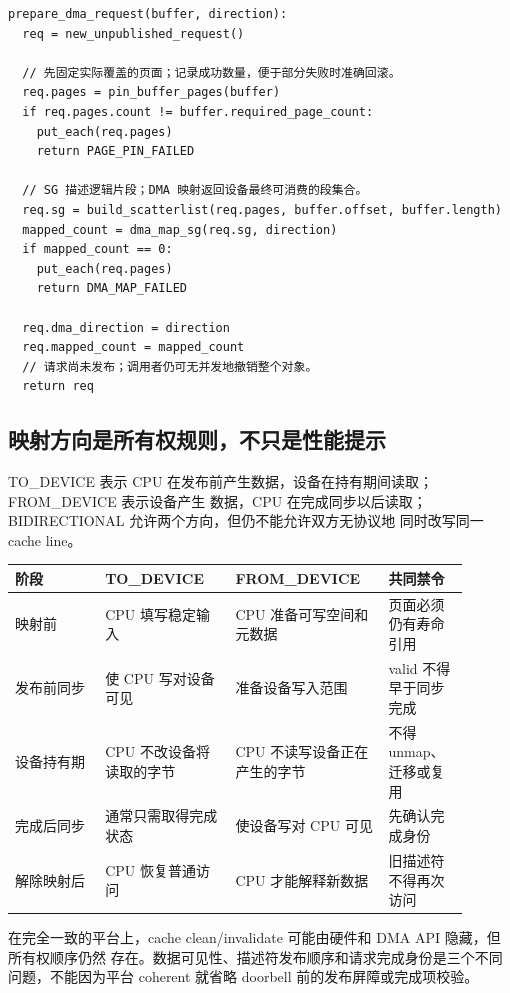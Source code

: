\begin{lstlisting}
prepare_dma_request(buffer, direction):
  req = new_unpublished_request()

  // 先固定实际覆盖的页面；记录成功数量，便于部分失败时准确回滚。
  req.pages = pin_buffer_pages(buffer)
  if req.pages.count != buffer.required_page_count:
    put_each(req.pages)
    return PAGE_PIN_FAILED

  // SG 描述逻辑片段；DMA 映射返回设备最终可消费的段集合。
  req.sg = build_scatterlist(req.pages, buffer.offset, buffer.length)
  mapped_count = dma_map_sg(req.sg, direction)
  if mapped_count == 0:
    put_each(req.pages)
    return DMA_MAP_FAILED

  req.dma_direction = direction
  req.mapped_count = mapped_count
  // 请求尚未发布；调用者仍可无并发地撤销整个对象。
  return req
\end{lstlisting}

\subsection{映射方向是所有权规则，不只是性能提示}

TO\_DEVICE 表示 CPU 在发布前产生数据，设备在持有期间读取；FROM\_DEVICE 表示设备产生
数据，CPU 在完成同步以后读取；BIDIRECTIONAL 允许两个方向，但仍不能允许双方无协议地
同时改写同一 cache line。

\begin{longtable}{|L{0.18\linewidth}|L{0.26\linewidth}|L{0.3\linewidth}|L{0.16\linewidth}|}
\hline
阶段 & TO\_DEVICE & FROM\_DEVICE & 共同禁令 \\ \hline
映射前 & CPU 填写稳定输入 & CPU 准备可写空间和元数据 & 页面必须仍有寿命引用 \\\tablerowrule
发布前同步 & 使 CPU 写对设备可见 & 准备设备写入范围 & valid 不得早于同步完成 \\\tablerowrule
设备持有期 & CPU 不改设备将读取的字节 & CPU 不读写设备正在产生的字节 &
不得 unmap、迁移或复用 \\\tablerowrule
完成后同步 & 通常只需取得完成状态 & 使设备写对 CPU 可见 & 先确认完成身份 \\\tablerowrule
解除映射后 & CPU 恢复普通访问 & CPU 才能解释新数据 & 旧描述符不得再次访问 \\ \hline
\end{longtable}

在完全一致的平台上，cache clean/invalidate 可能由硬件和 DMA API 隐藏，但所有权顺序仍然
存在。数据可见性、描述符发布顺序和请求完成身份是三个不同问题，不能因为平台 coherent
就省略 doorbell 前的发布屏障或完成项校验。

